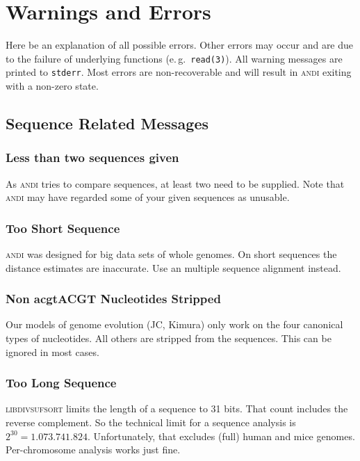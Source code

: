 \documentclass[a4paper,
  10pt,
  english,
  DIV=12,
  BCOR=8mm]{scrbook}
\newcommand{\algo}[1]{\textsc{{#1}}}
\newcommand{\andi}{\algo{andi}\xspace}
\begin{document}
\chapter{Warnings and Errors}

Here be an explanation of all possible errors. Other errors may occur and are due to the failure of underlying functions (e.\,g.~\lstinline$read(3)$). All warning messages are printed to \lstinline$stderr$. Most errors are non-recoverable and will result in \andi exiting with a non-zero state.

\section{Sequence Related Messages}

\subsection*{Less than two sequences given}

As \andi tries to compare sequences, at least two need to be supplied. Note that \andi may have regarded some of your given sequences as unusable.

\subsection*{Too Short Sequence}

\andi was designed for big data sets of whole genomes. On short sequences the distance estimates are inaccurate. Use an multiple sequence alignment instead.

\subsection*{Non acgtACGT Nucleotides Stripped}

Our models of genome evolution (JC, Kimura) only work on the four canonical types of nucleotides. All others are stripped from the sequences. This can be ignored in most cases.

\subsection*{Too Long Sequence}

\algo{libdivsufsort} limits the length of a sequence to 31 bits. That count includes the reverse complement. So the technical limit for a sequence analysis is $2^{30} = 1.073.741.824$. Unfortunately, that excludes (full) human and mice genomes. Per-chromosome analysis works just fine.
\end{document}
